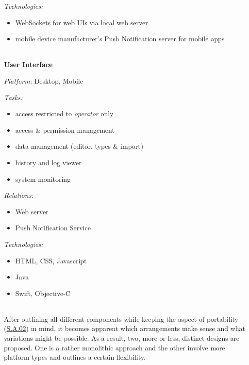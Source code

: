 \documentclass[12pt,english,a4paper,titlepage,cleardoublepage=empty,dottedtoc]{report}
\providecommand{\tightlist}{%
  \setlength{\itemsep}{0pt}\setlength{\parskip}{0pt}}
\begin{document}
\emph{Technologies:}

\begin{itemize}
\tightlist
\item
  WebSockets for web UIs via local web server
\item
  mobile device manufacturer's Push Notification server for mobile apps
\end{itemize}

~\\
\textbf{User Interface}

\emph{Platform:} Desktop, Mobile

\emph{Tasks:}

\begin{itemize}
\tightlist
\item
  access restricted to \emph{operator} only
\item
  access \& permission management
\item
  data management (editor, types \& import)
\item
  history and log viewer
\item
  system monitoring
\end{itemize}

\emph{Relations:}

\begin{itemize}
\tightlist
\item
  Web server
\item
  Push Notification Service
\end{itemize}

\emph{Technologies:}

\begin{itemize}
\tightlist
\item
  HTML, CSS, Javascript
\item
  Java
\item
  Swift, Objective-C
\end{itemize}

~\\
After outlining all different components while keeping the aspect of
portability (\protect\hyperlink{sa02}{S.A.02}) in mind, it becomes
apparent which arrangements make sense and what variations might be
possible. As a result, two, more or less, distinct designs are proposed.
One is a rather monolithic approach and the other involve more platform
types and outlines a certain flexibility.
\end{document}
